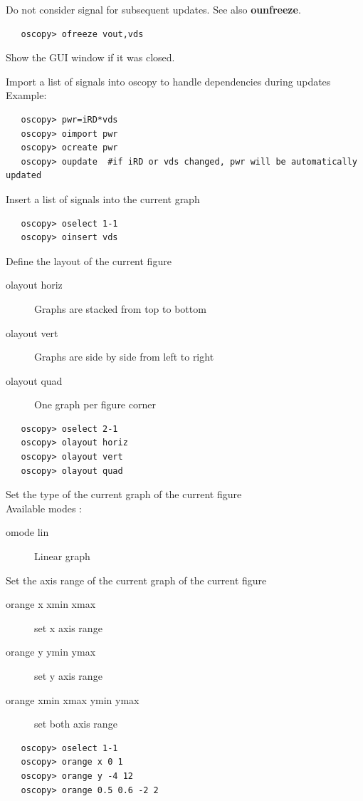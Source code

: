 \documentclass[a4paper,11pt]{article}
\begin{document}
   Do not consider signal for subsequent updates. See also \textbf{ounfreeze}.
\begin{verbatim}
   oscopy> ofreeze vout,vds
\end{verbatim}

   Show the GUI window if it was closed.

   Import a list of signals into oscopy to handle dependencies during updates
   Example:
\begin{verbatim}
   oscopy> pwr=iRD*vds
   oscopy> oimport pwr
   oscopy> ocreate pwr
   oscopy> oupdate  #if iRD or vds changed, pwr will be automatically updated
\end{verbatim}

   Insert a list of signals into the current graph
\begin{verbatim}
   oscopy> oselect 1-1
   oscopy> oinsert vds
\end{verbatim}

   Define the layout of the current figure
   \begin{description}
   \item[olayout horiz] Graphs are stacked from top to bottom
   \item[olayout vert] Graphs are side by side from left to right
   \item[olayout quad] One graph per figure corner
   \end{description}
\begin{verbatim}
   oscopy> oselect 2-1
   oscopy> olayout horiz
   oscopy> olayout vert
   oscopy> olayout quad
\end{verbatim}

   Set the type of the current graph of the current figure\\
   Available modes :
   \begin{description}
   \item[omode lin]      Linear graph
   \end{description}

   Set the axis range of the current graph of the current figure
   \begin{description}
   \item[orange x xmin xmax] set x axis range
   \item[orange y ymin ymax] set y axis range
   \item[orange xmin xmax ymin ymax] set both axis range
   \end{description}
\begin{verbatim}
   oscopy> oselect 1-1
   oscopy> orange x 0 1
   oscopy> orange y -4 12
   oscopy> orange 0.5 0.6 -2 2
\end{verbatim}
\end{document}
